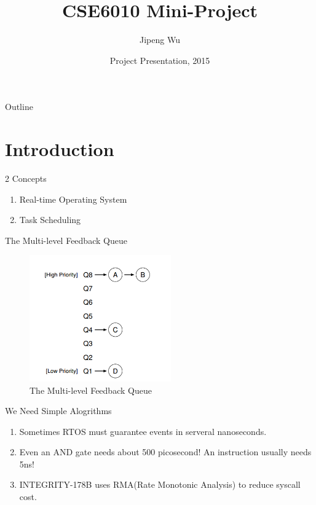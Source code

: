 ﻿\documentclass{beamer}
\title[Simulation and Performance Analysis of RTOS Task Scheduling] {CSE6010 Mini-Project}
\subtitle{}
\author[Author]{Jipeng Wu}
\institute[Universities of Somewhere and Elsewhere] {
                                 College of Computing\\
                                 Georgia Institute of Technology
     }
\date[CSE 2015]
     {Project Presentation, 2015}
\begin{document}
\begin{frame}
  \titlepage
\end{frame}

\begin{frame}{Outline}
  \tableofcontents
\end{frame}


\section{Introduction}
\begin{frame}{2 Concepts}
  \begin{enumerate}
  \item Real-time Operating System
  \item Task Scheduling
  \end{enumerate}
\end{frame}

\begin{frame}{The Multi-level Feedback Queue}
  \begin{figure}[H]
    \includegraphics[width=2.4in]{1.PNG}
    \caption{The Multi-level Feedback Queue}
  \end{figure}
\end{frame}

\begin{frame}{We Need Simple Alogrithms}
  \begin{enumerate}
  \item Sometimes RTOS must guarantee events in serveral nanoseconds.       \pause
  \item Even an AND gate needs about 500 picosecond! An instruction usually needs 5ns! \pause
  \item INTEGRITY-178B uses RMA(Rate Monotonic Analysis) to reduce syscall cost.   \pause 
  \end{enumerate}
\end{frame}
\end{document}
